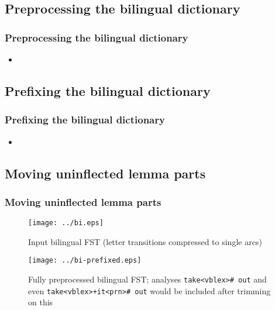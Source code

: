 \documentclass[notes=hide]{beamer}
\newcommand{\ana}[1]{\texttt{#1}}
\begin{document}
\subsection{Preprocessing the bilingual dictionary}
\begin{frame}
  \frametitle{Preprocessing the bilingual dictionary}
  \begin{itemize}
  \item
  \end{itemize}
\end{frame}

\subsection{Prefixing the bilingual dictionary}
\begin{frame}
  \frametitle{Prefixing the bilingual dictionary}
  \begin{itemize}
  \item
  \end{itemize}
\end{frame}

\subsection{Moving uninflected lemma parts}
\begin{frame}
  \frametitle{Moving uninflected lemma parts}

\begin{figure}[h]
  \begin{center}
    \texttt{[image: ../bi.eps]}
    \caption{Input bilingual FST (letter transitions compressed to single arcs)}
    \label{fig:bi-prefixed}
  \end{center}
\end{figure}

\begin{figure}[h]
  \begin{center}
    \texttt{[image: ../bi-prefixed.eps]}
    \caption{Fully preprocessed bilingual FST; analyses \ana{take<vblex>\# out} and even \ana{take<vblex>+it<prn>\# out}    would be included after trimming on this}
    \label{fig:bi-prefixed}
  \end{center}
\end{figure}

\end{frame}
\end{document}
